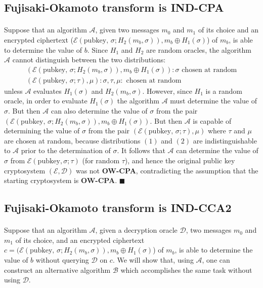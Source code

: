 \documentclass[letterpaper,12pt,oneside,onecolumn]{report}
\begin{document}
 \subsection*{Fujisaki-Okamoto transform is IND-CPA}
 \paragraph{}
 Suppose that an algorithm $\mathcal{A}$, given two  messages $m_0$ and $m_1$ of its choice and an encrypted ciphertext ($\mathcal{E}(\text{pubkey, }\sigma;H_2(m_b,\sigma)), m_b \oplus H_1(\sigma)$) of $m_b$, is able to determine the value of $b$. Since $H_1$ and $H_2$ are random oracles, the algorithm $\mathcal{A}$ cannot distinguish between the two distributions:
 \begin{align}
 (\mathcal{E}(\text{pubkey, }\sigma;H_2(m_b,\sigma)), m_b \oplus H_1(\sigma)) : \sigma \text{ chosen at random} \\
 (\mathcal{E}(\text{pubkey, }\sigma;\tau), \mu) : \sigma, \tau, \mu : \text{ chosen at random}
 \end{align}
 unless $\mathcal{A}$ evaluates $H_1(\sigma)$ and $H_2(m_b, \sigma)$. However, since $H_1$ is a random oracle, in order to evaluate $H_1(\sigma)$ the algorithm $\mathcal{A}$ must determine the value of $\sigma$. But then $\mathcal{A}$ can also determine the value of $\sigma$ from the pair $(\mathcal{E}(\text{pubkey, }\sigma;H_2(m_b,\sigma)), m_b \oplus H_1(\sigma))$. But then $\mathcal{A}$ is capable of determining the value of $\sigma$ from the pair $(\mathcal{E}(\text{pubkey, }\sigma;\tau), \mu)$ where $\tau$ and $\mu$ are chosen at random, because distributions $(1)$ and $(2)$ are indistinguishable to $\mathcal{A}$ prior to the determination of $\sigma$. It follows that $\mathcal{A}$ can determine the value of $\sigma$ from $\mathcal{E}(\text{pubkey},\sigma; \tau)$ (for random $\tau$), and hence the original public key cryptosystem $(\mathcal{E}, \mathcal{D})$ was not \textbf{OW-CPA}, contradicting the assumption that the starting cryptosystem is \textbf{OW-CPA}. $\blacksquare$
\subsection*{Fujisaki-Okamoto transform is IND-CCA2}
\paragraph{}
Suppose that an algorithm $\mathcal{A}$, given a decryption oracle $\mathcal{D}$, two messages $m_0$ and $m_1$ of its choice, and an encrypted ciphertext $c = (\mathcal{E}(\text{pubkey, }\sigma;H_2(m_b,\sigma)), m_b \oplus H_1(\sigma)$) of $m_b$, is able to determine the value of $b$ without querying $\mathcal{D}$ on $c$. We will show that, using $\mathcal{A}$, one can construct an alternative algorithm $\mathcal{B}$ which accomplishes the same task without using $\mathcal{D}$.
\end{document}
